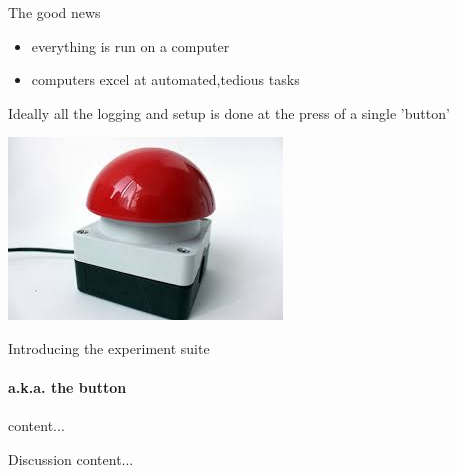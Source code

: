 \documentclass[11pt]{beamer}
\begin{document}
	\begin{frame}{The good news}
		\begin{itemize}
			\item everything is run on a computer
			\item computers excel at automated,tedious tasks
		\end{itemize}
		Ideally all the logging and setup is done at the press of a single 'button'
		\begin{center}
			\includegraphics[height=0.3\textheight]{figures/redbutton}
		\end{center}
	\end{frame}
	
	\begin{frame}{Introducing the experiment suite}
		\framesubtitle{a.k.a. the button}
		content...
	\end{frame}
	
	\begin{frame}{Discussion}
		content...
	\end{frame}
			
\end{document}
